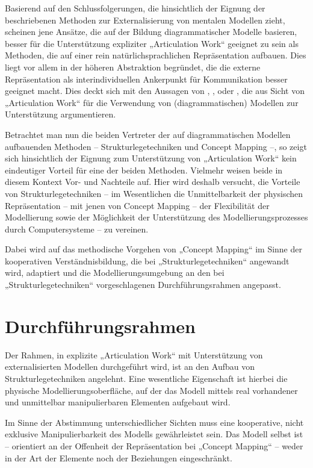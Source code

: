 Basierend auf den Schlussfolgerungen, die \citet{Ifenthaler06} hinsichtlich der Eignung der beschriebenen Methoden zur Externalisierung von mentalen Modellen zieht, scheinen jene Ansätze, die auf der Bildung diagrammatischer Modelle basieren, besser für die Unterstützung expliziter „Articulation Work“ geeignet zu sein als Methoden, die auf einer rein natürlichsprachlichen Repräsentation aufbauen. Dies liegt vor allem in der höheren Abstraktion begründet, die die externe Repräsentation als interindividuellen Ankerpunkt für Kommunikation besser geeignet macht. Dies deckt sich mit den Aussagen von  \citet{Sarini02}, \citet{Herrmann02}, \citet{Raposo04} oder \citet{Jorgensen04}, die aus Sicht von „Articulation Work“ für die Verwendung von (diagrammatischen) Modellen zur Unterstützung argumentieren.

Betrachtet man nun die beiden Vertreter der auf diagrammatischen Modellen aufbauenden Methoden -- Strukturlegetechniken und Concept Mapping --, so zeigt sich hinsichtlich der Eignung zum Unterstützung von „Articulation Work“ kein eindeutiger Vorteil für eine der beiden Methoden. Vielmehr weisen beide in diesem Kontext Vor- und Nachteile auf. Hier wird deshalb versucht, die Vorteile von Strukturlegetechniken -- im Wesentlichen die Unmittelbarkeit der physischen Repräsentation -- mit jenen von Concept Mapping -- der Flexibilität der Modellierung sowie der Möglichkeit der Unterstützung des Modellierungsprozesses durch Computersysteme -- zu vereinen.

Dabei wird auf das methodische Vorgehen von „Concept Mapping“ im Sinne der kooperativen Verständnisbildung, die bei „Strukturlegetechniken“ angewandt wird, adaptiert und die Modellierungsumgebung an den bei „Strukturlegetechniken“ vorgeschlagenen Durchführungsrahmen angepasst.

\section{Durchführungsrahmen} %
\label{sec:durchführungsrahmen}

Der Rahmen, in explizite „Articulation Work“ mit Unterstützung von externalisierten Modellen durchgeführt wird, ist an den Aufbau von Strukturlegetechniken angelehnt. Eine wesentliche Eigenschaft ist hierbei die physische Modellierungsoberfläche, auf der das Modell mittels real vorhandener und unmittelbar manipulierbaren Elementen aufgebaut wird. 

Im Sinne der Abstimmung unterschiedlicher Sichten muss eine kooperative, nicht exklusive Manipulierbarkeit des Modells gewährleistet sein. Das Modell selbst ist -- orientiert an der Offenheit der Repräsentation bei „Concept Mapping“ -- weder in der Art der Elemente noch der Beziehungen eingeschränkt. 

